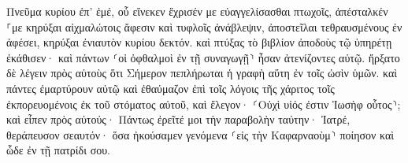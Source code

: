\documentclass{openreader}
\begin{document}
Πνεῦμα κυρίου ἐπ’ ἐμέ, οὗ εἵνεκεν ἔχρισέν με εὐαγγελίσασθαι πτωχοῖς, ἀπέσταλκέν ⸀με κηρύξαι αἰχμαλώτοις ἄφεσιν καὶ τυφλοῖς ἀνάβλεψιν, ἀποστεῖλαι τεθραυσμένους ἐν ἀφέσει, 
κηρύξαι ἐνιαυτὸν κυρίου δεκτόν. 
καὶ πτύξας τὸ βιβλίον ἀποδοὺς τῷ ὑπηρέτῃ ἐκάθισεν· καὶ πάντων ⸂οἱ ὀφθαλμοὶ ἐν τῇ συναγωγῇ⸃ ἦσαν ἀτενίζοντες αὐτῷ. 
ἤρξατο δὲ λέγειν πρὸς αὐτοὺς ὅτι Σήμερον πεπλήρωται ἡ γραφὴ αὕτη ἐν τοῖς ὠσὶν ὑμῶν. 
καὶ πάντες ἐμαρτύρουν αὐτῷ καὶ ἐθαύμαζον ἐπὶ τοῖς λόγοις τῆς χάριτος τοῖς ἐκπορευομένοις ἐκ τοῦ στόματος αὐτοῦ, καὶ ἔλεγον· ⸂Οὐχὶ υἱός ἐστιν Ἰωσὴφ οὗτος⸃; 
καὶ εἶπεν πρὸς αὐτούς· Πάντως ἐρεῖτέ μοι τὴν παραβολὴν ταύτην· Ἰατρέ, θεράπευσον σεαυτόν· ὅσα ἠκούσαμεν γενόμενα ⸂εἰς τὴν Καφαρναοὺμ⸃ ποίησον καὶ ὧδε ἐν τῇ πατρίδι σου. 
\end{document}
